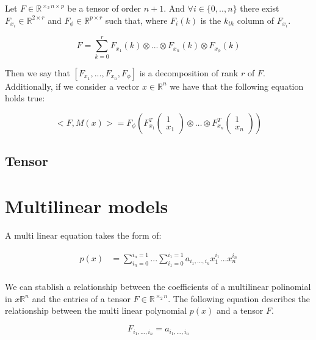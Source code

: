 \documentclass{article}
\begin{document}
Let $F \in \mathbb{R}^{\times_2 n \times p}$ be a tensor of order $n+1$.
And $\forall i \in \{0,..,n\} $ there exist $F_{x_i} \in \mathbb{R}^{2 \times r}$
and $F_\phi  \in \mathbb{R}^{p \times r}$ such that, where $F_{i}(k)$ is the $k_{th}$
column of $F_{x_i}$. 

\begin{equation}
    F = \sum_{k = 0}^r F_{x_1}(k) \otimes ... \otimes F_{x_n}(k) \otimes F_{x_\phi}(k) 
\end{equation}

Then we say that $[F_{x_1}, ..., F_{x_n}, F_\phi]$ is a decomposition of rank $r$ 
of $F$. Additionally, if we consider a vector $x \in \mathbb{R}^n$ we have that 
the following equation holds true:

\begin{equation}
    <F, M(x)> = F_{\phi}(F_{x_1}^T 
    \begin{pmatrix}
        1 \\
        x_1    
    \end{pmatrix}
    \circledast
    \dots
    \circledast
    F_{x_n}^T
    \begin{pmatrix}
        1 \\
        x_n    
    \end{pmatrix})
\end{equation}

\subsection{Tensor }

\section{Multilinear models}

A multi linear equation takes the form of:

\begin{align}
    p(x) &= \sum_{i_n = 0}^{i_n = 1}...\sum_{i_1 = 0}^{i_1 = 1} a_{i_1, ..., i_n} x_1^{i_1}...x_n^{i_n} \\ 
\end{align}

We can stablish a relationship between the coefficients of a multilinear polinomial in $x\mathbb{R}^{n}$ 
and the entries of a tensor $F \in \mathbb{R}^{\times_2 n}$. The following equation describes the relationship between
the multi linear polynomial $p(x)$ and a tensor $F$.

\begin{equation}
    F_{i_1,...,i_n} = a_{i_1, ..., i_n}
\end{equation}
\end{document}

